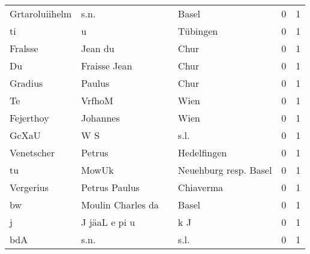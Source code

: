 \begin{tabular}{llllrr}
           Grtaroluiihelm &                               s.n. &             &                                       Basel &          0 &         1 \\
                       ti &                                  u &             &                                    Tübingen &          0 &         1 \\
                  Fralsse &                            Jean du &             &                                        Chur &          0 &         1 \\
                       Du &                       Fraisse Jean &             &                                        Chur &          0 &         1 \\
                  Gradius &                             Paulus &             &                                        Chur &          0 &         1 \\
                       Te &                             VrfhoM &             &                                        Wien &          0 &         1 \\
                Fejerthoy &                           Johannes &             &                                        Wien &          0 &         1 \\
                    GcXaU &                                W S &             &                                        s.l. &          0 &         1 \\
               Venetscher &                             Petrus &             &                                 Hedelfingen &          0 &         1 \\
                       tu &                              MowUk &             &                       Neuehburg resp. Basel &          0 &         1 \\
                Vergerius &                      Petrus Paulus &             &                                   Chiaverma &          0 &         1 \\
                       bw &                  Moulin Charles da &             &                                       Basel &          0 &         1 \\
                        j &                      J jäaL e pi u &             &                                         k J &          0 &         1 \\
                      bdA &                               s.n. &             &                                        s.l. &          0 &         1 \\

\end{tabular}
